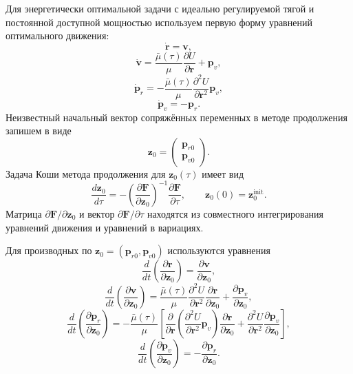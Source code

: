 Для энергетически оптимальной задачи с идеально регулируемой тягой и постоянной доступной мощностью используем первую форму уравнений оптимального движения:
\begin{equation}
	\dot{\mathbf r}
	=
	\mathbf v,
\end{equation}
\begin{equation}
	\dot{\mathbf v}
	=
	\frac{\bar\mu(\tau)}{\mu}
	\frac{\partial U}{\partial \mathbf r}
	+
	\mathbf p_v,
\end{equation}
\begin{equation}
	\dot{\mathbf p}_r
	=
	-
	\frac{\bar\mu(\tau)}{\mu}
	\frac{\partial^2 U}{\partial \mathbf r^2}
	\mathbf p_v,
\end{equation}
\begin{equation}
	\dot{\mathbf p}_v
	=
	-\mathbf p_r .
\end{equation}
Неизвестный начальный вектор сопряжённых переменных в методе продолжения запишем в виде
\begin{equation}
	\mathbf z_0
	=
	\begin{pmatrix}
		\mathbf p_{r0}\\
		\mathbf p_{v0}
	\end{pmatrix}.
\end{equation}
Задача Коши метода продолжения для \(\mathbf z_0(\tau)\) имеет вид
\begin{equation}
	\frac{d\mathbf z_0}{d\tau}
	=
	-
	\left(
	\frac{\partial \mathbf F}{\partial \mathbf z_0}
	\right)^{-1}
	\frac{\partial \mathbf F}{\partial \tau},
	\qquad
	\mathbf z_0(0)=\mathbf z_0^{\mathrm{init}} .
\end{equation}
Матрица \(\partial \mathbf F/\partial \mathbf z_0\) и вектор \(\partial \mathbf F/\partial \tau\) находятся из совместного интегрирования уравнений движения и уравнений в вариациях.

Для производных по \(\mathbf z_0=(\mathbf p_{r0},\mathbf p_{v0})\) используются уравнения
\begin{equation}
	\frac{d}{dt}
	\left(
	\frac{\partial \mathbf r}{\partial \mathbf z_0}
	\right)
	=
	\frac{\partial \mathbf v}{\partial \mathbf z_0},
\end{equation}
\begin{equation}
	\frac{d}{dt}
	\left(
	\frac{\partial \mathbf v}{\partial \mathbf z_0}
	\right)
	=
	\frac{\bar\mu(\tau)}{\mu}
	\frac{\partial^2 U}{\partial \mathbf r^2}
	\frac{\partial \mathbf r}{\partial \mathbf z_0}
	+
	\frac{\partial \mathbf p_v}{\partial \mathbf z_0},
\end{equation}
\begin{equation}
	\frac{d}{dt}
	\left(
	\frac{\partial \mathbf p_r}{\partial \mathbf z_0}
	\right)
	=
	-
	\frac{\bar\mu(\tau)}{\mu}
	\left[
	\frac{\partial}{\partial \mathbf r}
	\left(
	\frac{\partial^2 U}{\partial \mathbf r^2}\mathbf p_v
	\right)
	\frac{\partial \mathbf r}{\partial \mathbf z_0}
	+
	\frac{\partial^2 U}{\partial \mathbf r^2}
	\frac{\partial \mathbf p_v}{\partial \mathbf z_0}
	\right],
\end{equation}
\begin{equation}
	\frac{d}{dt}
	\left(
	\frac{\partial \mathbf p_v}{\partial \mathbf z_0}
	\right)
	=
	-
	\frac{\partial \mathbf p_r}{\partial \mathbf z_0}.
\end{equation}

